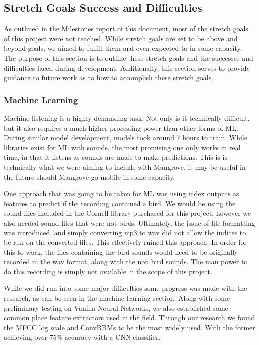 \subsection{Stretch Goals Success and Difficulties}
As outlined in the Milestones report of this document, most of the stretch goals of this project were not reached. While stretch goals are set to be above and beyond goals, we aimed to fulfill them and even expected to in some capacity. The purpose of this section is to outline these stretch goals and the successes and difficulties faced during development. Additionally, this section serves to provide guidance to future work as to how to accomplish these stretch goals.\\

\subsubsection{Machine Learning}
Machine listening is a highly demanding task. Not only is it technically difficult, but it also requires a much higher processing power than other forms of ML. During similar model development, models took around 7 hours to train. While libraries exist for ML with sounds, the most promising one only works in real time, in that it listens as sounds are made to make predictions. This is is technically what we were aiming to include with Mangrove, it may be useful in the future should Mangrove go mobile in some capacity.\cite{EARS}\par
One approach that was going to be taken for ML was using index outputs as features to predict if the recording contained a bird. We would be using the sound files included in the Cornell library purchased for this project, however we also needed sound files that were not birds. Ultimately, the issue of file formatting was introduced, and simply converting mp3 to wav did not allow the indices to be run on the converted files. This effectively ruined this approach. In order for this to work, the files containing the bird sounds would need to be originally recorded in the wav format, along with the non bird sounds. The man power to do this recording is simply not available in the scope of this project.\par
While we did run into some major difficulties some progress was made with the research, as can be seen in the machine learning section. Along with some preliminary testing on Vanilla Neural Networks, we also established some common place feature extractors used in the field. Through our research we found the MFCC log scale and ConvRBM\textquotesingle s to be the most widely used. With the former achieving over 75\% accuracy with a CNN classifier.\par
